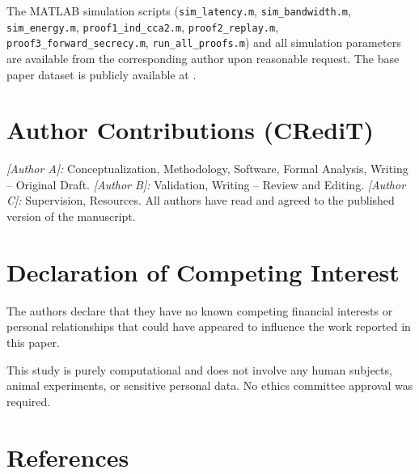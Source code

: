 \documentclass[conference]{IEEEtran}
\begin{document}
The MATLAB simulation scripts (\texttt{sim\_latency.m},
\texttt{sim\_bandwidth.m}, \texttt{sim\_energy.m},
\texttt{proof1\_ind\_cca2.m}, \texttt{proof2\_replay.m},
\texttt{proof3\_forward\_secrecy.m}, \texttt{run\_all\_proofs.m}) and
all simulation parameters are available from the corresponding author
upon reasonable request. The base paper dataset is publicly available
at .

\section*{Author Contributions (CRediT)}
\textit{[Author A]:} Conceptualization, Methodology, Software, Formal
Analysis, Writing -- Original Draft.
\textit{[Author B]:} Validation, Writing -- Review and Editing.
\textit{[Author C]:} Supervision, Resources.
All authors have read and agreed to the published version of the manuscript.

\section*{Declaration of Competing Interest}
The authors declare that they have no known competing financial interests
or personal relationships that could have appeared to influence the work
reported in this paper.

This study is purely computational and does not involve any human subjects,
animal experiments, or sensitive personal data. No ethics committee
approval was required.

\section*{References}

\end{document}
